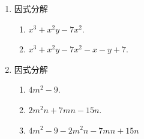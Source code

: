 \documentclass[11pt]{article}
\begin{document}
\begin{enumerate}
            \hrulefill
            
            \hrulefill
            
            \hrulefill
            
            \hrulefill
            
            \hrulefill

        \pagebreak
        \item 因式分解\begin{enumerate}
            \item $x^3+x^2y-7x^2$.
            \item $x^3+x^2y-7x^2-x-y+7$.
        \end{enumerate}
        \hrulefill
            
            \hrulefill
            
            \hrulefill
            
            \hrulefill
            
            \hrulefill
            
            \hrulefill
            
            \hrulefill
            
            \hrulefill
            
            \hrulefill
            
            \hrulefill
            
            \hrulefill

        \item 因式分解\begin{enumerate}
            \item $4m^2-9$.
            \item $2m^2n+7mn-15n$.
            \item $4m^2-9-2m^2n-7mn+15n$
        \end{enumerate}
        \hrulefill
            
            \hrulefill
            
            \hrulefill
            
            \hrulefill
            
            \hrulefill
            
            \hrulefill
            
            \hrulefill
            
            \hrulefill
            
            \hrulefill
            

\end{enumerate}
\end{document}
